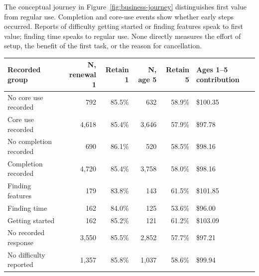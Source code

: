 \documentclass[10pt]{article}
\begin{document}
\NewPage
{}
The conceptual journey in Figure~\ref{fig:business-journey} distinguishes first value from regular use. Completion and core-use events show whether early steps occurred. Reports of difficulty getting started or finding features speak to first value; finding time speaks to regular use. None directly measures the effort of setup, the benefit of the first task, or the reason for cancellation.
{\fontsize{8}{10}\selectfont \par\begin{tabularx}{\linewidth}{@{}p{.27\linewidth}rrrrY@{}}\toprule
\textbf{Recorded group} & \textbf{N, renewal 1} & \textbf{Retain 1} & \textbf{N, age 5} & \textbf{Retain 5} & \textbf{Ages 1--5 contribution}\\\midrule
No core use recorded & 792 & 85.5\% & 632 & 58.9\% & \$100.35\\
Core use recorded & 4,618 & 85.4\% & 3,646 & 57.9\% & \$97.78\\
No completion recorded & 690 & 86.1\% & 520 & 58.5\% & \$98.16\\
Completion recorded & 4,720 & 85.4\% & 3,758 & 58.0\% & \$98.16\\
Finding features & 179 & 83.8\% & 143 & 61.5\% & \$101.85\\
Finding time & 162 & 84.0\% & 125 & 53.6\% & \$96.00\\
Getting started & 162 & 85.2\% & 121 & 61.2\% & \$103.09\\
No recorded response & 3,550 & 85.5\% & 2,852 & 57.7\% & \$97.21\\
No difficulty reported & 1,357 & 85.8\% & 1,037 & 58.6\% & \$99.94\\
\bottomrule\end{tabularx}\par}
\end{document}
